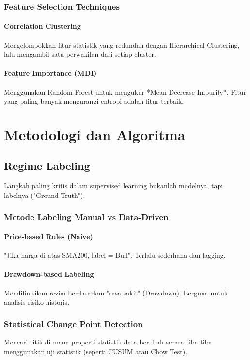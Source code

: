 \documentclass[12pt,a4paper]{book}
\begin{document}
\section{Feature Selection Techniques}
\subsection{Correlation Clustering}
Mengelompokkan fitur statistik yang redundan dengan Hierarchical Clustering, lalu mengambil satu perwakilan dari setiap cluster.

\subsection{Feature Importance (MDI)}
Menggunakan Random Forest untuk mengukur *Mean Decrease Impurity*. Fitur yang paling banyak mengurangi entropi adalah fitur terbaik.

\part{Metodologi dan Algoritma}

\chapter{Regime Labeling}
Langkah paling kritis dalam supervised learning bukanlah modelnya, tapi labelnya ("Ground Truth").

\section{Metode Labeling Manual vs Data-Driven}
\subsection{Price-based Rules (Naive)}
"Jika harga di atas SMA200, label = Bull". Terlalu sederhana dan lagging.

\subsection{Drawdown-based Labeling}
Mendifinisikan rezim berdasarkan "rasa sakit" (Drawdown). Berguna untuk analisis risiko historis.

\section{Statistical Change Point Detection}
Mencari titik di mana properti statistik data berubah secara tiba-tiba menggunakan uji statistik (seperti CUSUM atau Chow Test).
\end{document}
